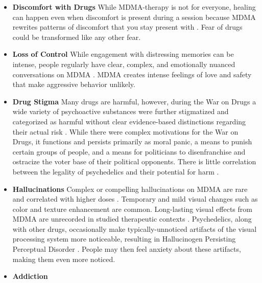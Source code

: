 \documentclass[12pt,letterpaper]{article}
\begin{document}
\begin{itemize}
    \item \textbf{Discomfort with Drugs}
     While MDMA-therapy is not for everyone, healing can happen even when discomfort is present during a session because MDMA rewrites patterns of discomfort that you stay present with \cite{fedduciaMDMAMemoryReconsolidation}. Fear of drugs could be transformed like any other fear.
    \item \textbf{Loss of Control}    
        While engagement with distressing memories can be intense, people regularly have clear, complex, and emotionally nuanced conversations on MDMA \cite{colbertEvenings,passieHistory}. MDMA creates intense feelings of love and safety that make aggressive behavior unlikely.
    \item \textbf{Drug Stigma}
        Many drugs are harmful, however, during the War on Drugs a wide variety of psychoactive substances were further stigmatized and categorized as harmful without clear evidence-based distinctions regarding their actual risk \cite{alexanderNewJimCrow,nuttDrugHarms}. While there were complex motivations for the War on Drugs, it functions and persists primarily as moral panic, a means to punish certain groups of people, and a means for politicians to disenfranchise and ostracize the voter base of their political opponents. There is little correlation between the legality of psychedelics and their potential for harm \cite{nuttDrugHarms}.
    \item \textbf{Hallucinations}
        Complex or compelling hallucinations on MDMA are rare and correlated with higher doses \cite{liechtiGender}. Temporary and mild visual changes such as color and texture enhancement are common. Long-lasting visual effects from MDMA are unrecorded in studied therapeutic contexts \cite{vizeliActuteEffects}. Psychedelics, along with other drugs, occasionally make typically-unnoticed artifacts of the visual processing system more noticeable, resulting in Hallucinogen Persisting Perceptual Disorder \cite{halpernHPPD,alexanderHPPD}. People may then feel anxiety about these artifacts, making them even more noticed.
    \item \textbf{Addiction}
     

\end{itemize}
\end{document}
